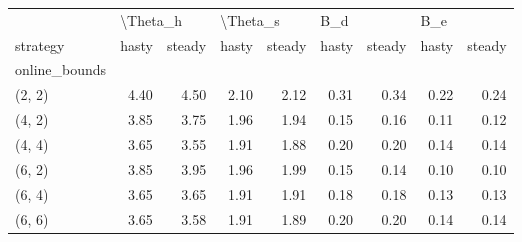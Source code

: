 \begin{tabular}{lrrrrrrrr}
\toprule
{} & \multicolumn{2}{l}{\textbackslash Theta\_h} & \multicolumn{2}{l}{\textbackslash Theta\_s} & \multicolumn{2}{l}{B\_d} & \multicolumn{2}{l}{B\_e} \\
strategy &    hasty & steady &    hasty & steady & hasty & steady & hasty & steady \\
online\_bounds &          &        &          &        &       &        &       &        \\
\midrule
(2, 2)        &     4.40 &   4.50 &     2.10 &   2.12 &  0.31 &   0.34 &  0.22 &   0.24 \\
(4, 2)        &     3.85 &   3.75 &     1.96 &   1.94 &  0.15 &   0.16 &  0.11 &   0.12 \\
(4, 4)        &     3.65 &   3.55 &     1.91 &   1.88 &  0.20 &   0.20 &  0.14 &   0.14 \\
(6, 2)        &     3.85 &   3.95 &     1.96 &   1.99 &  0.15 &   0.14 &  0.10 &   0.10 \\
(6, 4)        &     3.65 &   3.65 &     1.91 &   1.91 &  0.18 &   0.18 &  0.13 &   0.13 \\
(6, 6)        &     3.65 &   3.58 &     1.91 &   1.89 &  0.20 &   0.20 &  0.14 &   0.14 \\
\bottomrule
\end{tabular}
